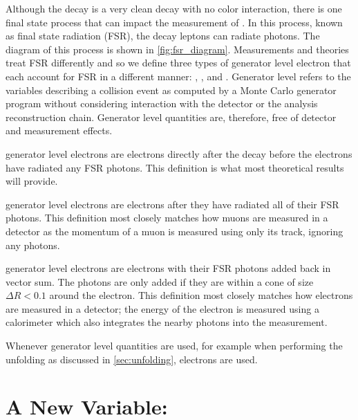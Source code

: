 Although the \Ztoee decay is a very clean decay with no color interaction,
there is one final state process that can impact the measurement of \Z
\bosonpt. In this process, known as final state radiation (FSR),  the decay
leptons can radiate photons.  The diagram of this process is shown in
\cref{fig:fsr_diagram}. Measurements and theories treat FSR differently and so
we define three types of generator level electron that each account for FSR in
a different manner: \born, \bare, and \dressed. Generator level refers to the
variables describing a collision event as computed by a Monte Carlo generator
program without considering interaction with the detector or the analysis
reconstruction chain. Generator level quantities are, therefore, free of
detector and measurement effects.

\Born generator level electrons are electrons directly after the \Ztoee decay
before the electrons have radiated any FSR photons. This definition is what
most theoretical results will provide.

\Bare generator level electrons are \born electrons after they have radiated all
of their FSR photons. This definition most closely matches how muons are
measured in a detector as the momentum of a muon is measured using only its
track, ignoring any photons.

\Dressed generator level electrons are \bare electrons with their FSR photons
added back in vector sum. The photons are only added if they are within a cone
of size $\Delta R < 0.1$ around the electron. This definition most closely
matches how electrons are measured in a detector; the energy of the electron is
measured using a calorimeter which also integrates the nearby photons into the
measurement.

Whenever generator level quantities are used, for example when performing the
unfolding as discussed in \cref{sec:unfolding}, \dressed electrons are
used.



\section{A New Variable: \texorpdfstring{\phistar}{Phistar}}


